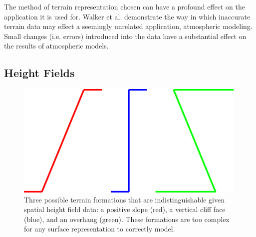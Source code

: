 The method of terrain representation chosen can have a profound effect on the application it is used for. Walker et al. \cite{elevationDataEffects} demonstrate the way in which inaccurate terrain data may effect a seemingly unrelated application, atmospheric modeling. Small changes (i.e. errors) introduced into the data have a substantial effect on the results of atmospheric models.


\subsection{Height Fields}

\begin{figure}
  \includegraphics[width=0.99\textwidth]{images/TerrainShapes.eps}
  \caption[Various terrain formations too complex for surface representations]{\label{figure:TerrainShapes}Three possible terrain formations that are indistinguishable given spatial height field data: a positive slope (red), a vertical cliff face (blue), and an overhang (green). These formations are too complex for any surface representation to correctly model.}
\end{figure}

